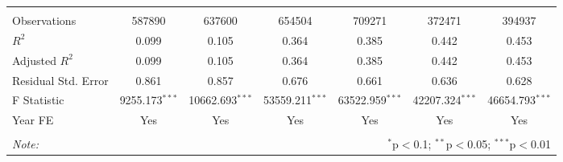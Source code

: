 \begin{tabular}{@{\extracolsep{5pt}}lcccccc}
\hline \\[-1.8ex]
 Observations & 587890 & 637600 & 654504 & 709271 & 372471 & 394937 \\
 $R^2$ & 0.099 & 0.105 & 0.364 & 0.385 & 0.442 & 0.453 \\
 Adjusted $R^2$ & 0.099 & 0.105 & 0.364 & 0.385 & 0.442 & 0.453 \\
 Residual Std. Error & 0.861  & 0.857  & 0.676  & 0.661  & 0.636  & 0.628  \\
 F Statistic & 9255.173$^{***}$  & 10662.693$^{***}$  & 53559.211$^{***}$  & 63522.959$^{***}$  & 42207.324$^{***}$  & 46654.793$^{***}$  \\
    Year FE & Yes & Yes & Yes & Yes & Yes & Yes \\
\hline
\hline \\[-1.8ex]
\textit{Note:} & \multicolumn{6}{r}{$^{*}$p$<$0.1; $^{**}$p$<$0.05; $^{***}$p$<$0.01} \\
\end{tabular}
